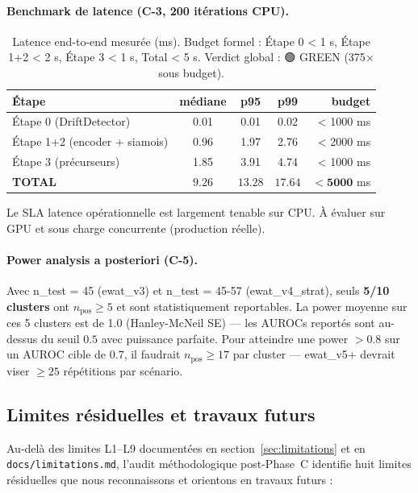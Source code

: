 \paragraph{Benchmark de latence (C-3, 200 itérations CPU).}
\begin{table}[h]
\centering
\caption{Latence end-to-end mesurée (ms). Budget formel : Étape 0 < 1 s,
Étape 1+2 < 2 s, Étape 3 < 1 s, Total < 5 s. Verdict global : 🟢 GREEN
(375$\times$ sous budget).}
\label{tab:latency}
\begin{tabular}{lcccr}
\toprule
\textbf{Étape} & \textbf{médiane} & \textbf{p95} & \textbf{p99} & \textbf{budget} \\
\midrule
Étape 0 (DriftDetector) & 0.01 & 0.01 & 0.02 & < 1000 ms \\
Étape 1+2 (encoder + siamois) & 0.96 & 1.97 & 2.76 & < 2000 ms \\
Étape 3 (précurseurs) & 1.85 & 3.91 & 4.74 & < 1000 ms \\
\textbf{TOTAL} & $\mathbf{9.26}$ & $\mathbf{13.28}$ & $\mathbf{17.64}$ & $\mathbf{< 5000}$ ms \\
\bottomrule
\end{tabular}
\end{table}

Le SLA latence opérationnelle est largement tenable sur CPU. À évaluer sur
GPU et sous charge concurrente (production réelle).

\paragraph{Power analysis a posteriori (C-5).}
Avec n\_test = 45 (ewat\_v3) et n\_test = 45-57 (ewat\_v4\_strat), seuls
\textbf{5/10 clusters} ont $n_{\text{pos}} \geq 5$ et sont statistiquement
reportables. La power moyenne sur ces 5 clusters est de 1.0 (Hanley-McNeil
SE) — les AUROCs reportés sont au-dessus du seuil $0.5$ avec puissance
parfaite. Pour atteindre une power $> 0.8$ sur un AUROC cible de $0.7$, il
faudrait $n_{\text{pos}} \geq 17$ par cluster — ewat\_v5+ devrait viser
$\geq 25$ répétitions par scénario.

\subsection{Limites résiduelles et travaux futurs}
\label{sec:residual_limits}

Au-delà des limites L1--L9 documentées en section~\ref{sec:limitations} et
en \texttt{docs/limitations.md}, l'audit méthodologique post-Phase~C identifie
huit limites résiduelles que nous reconnaissons et orientons en travaux futurs :

